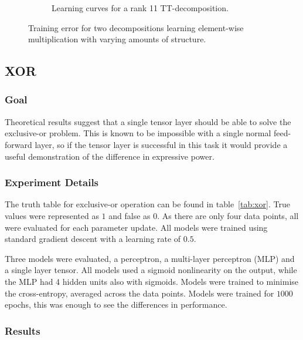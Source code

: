 \begin{figure}
\begin{subfigure}[t]{0.45\textwidth}
		\caption{Learning curves for a rank 11 TT-decomposition.}
	\end{subfigure}
	\caption{Training error for two decompositions learning element-wise multiplication with
	 varying amounts of structure.}
	\label{fig:correlate-multiply}
\end{figure}

\subsection{XOR}
\subsubsection{Goal}
Theoretical results suggest that a single tensor layer should be able to solve the exclusive-or problem.
This is known to be impossible with a single normal feed-forward layer, so if the tensor layer is successful
in this task it would provide a useful demonstration of the difference in expressive power.

\subsubsection{Experiment Details}
The truth table for exclusive-or operation can be found in table~\ref{tab:xor}. True values were represented
as \(1\) and false as \(0\). As there are only four data points, all were evaluated for each parameter update.
All models were trained using standard gradient descent with a learning rate of \(0.5\).

Three models were evaluated, a perceptron, a multi-layer perceptron (MLP) and a single layer tensor. All
models used a sigmoid nonlinearity on the output, while the MLP had 4 hidden units also with sigmoids. Models
were trained to minimise the cross-entropy, averaged across the data points. Models were trained for \(1000\)
epochs, this was enough to see the differences in performance.

\subsubsection{Results}


